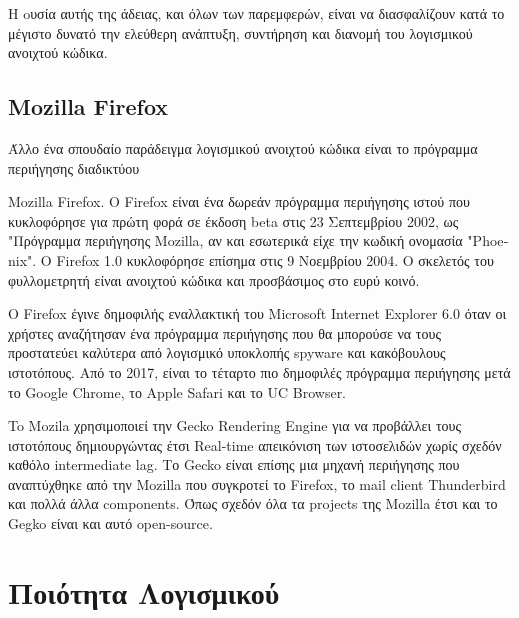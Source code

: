\documentclass[a4paper, 11pt]{article}
\begin{document}
{H oυσία αυτής της άδειας, και όλων των παρεμφερών, είναι να διασφαλίζουν κατά το μέγιστο δυνατό την ελεύθερη ανάπτυξη, συντήρηση και διανομή του λογισμικού ανοιχτού κώδικα.





\subsection{\textlatin{Mozilla Firefox}}
\indent Άλλο ένα σπουδαίο παράδειγμα λογισμικού ανοιχτού κώδικα είναι το πρόγραμμα περιήγησης διαδικτύου {\textlatin{Mozilla Firefox}. Ο \textlatin{Firefox} είναι ένα δωρεάν πρόγραμμα περιήγησης ιστού που κυκλοφόρησε για πρώτη φορά σε έκδοση beta στις 23 Σεπτεμβρίου 2002, ως "Πρόγραμμα περιήγησης \textlatin{Mozilla}, αν και εσωτερικά είχε την κωδική ονομασία \textlatin{"Phoenix"}. Ο \textlatin{Firefox} 1.0 κυκλοφόρησε επίσημα στις 9 Νοεμβρίου 2004. O σκελετός του φυλλομετρητή είναι ανοιχτού κώδικα και προσβάσιμος στο ευρύ κοινό.

Ο \textlatin{Firefox} έγινε δημοφιλής εναλλακτική του \textlatin{Microsoft Internet Explorer} 6.0 όταν οι χρήστες αναζήτησαν ένα πρόγραμμα περιήγησης που θα μπορούσε να τους προστατεύει καλύτερα από λογισμικό υποκλοπής \textlatin{spyware} και κακόβουλους ιστοτόπους. Από το 2017, είναι το τέταρτο πιο δημοφιλές πρόγραμμα περιήγησης μετά το \textlatin{Google Chrome}, το \textlatin{Apple Safari} και το \textlatin{UC Browser.}

To  \textlatin{Mozila} χρησιμοποιεί την  \textlatin{Gecko Rendering Engine} για να προβάλλει τους ιστοτόπους δημιουργώντας έτσι  \textlatin{Real-time} απεικόνιση των ιστοσελιδών χωρίς σχεδόν καθόλο  \textlatin{intermediate lag}. Το  \textlatin{Gecko} είναι επίσης μια μηχανή περιήγησης που αναπτύχθηκε από την  \textlatin{Mozilla} που συγκροτεί το  \textlatin{Firefox}, το  \textlatin{mail client Thunderbird} και πολλά άλλα  \textlatin{components}. Όπως σχεδόν όλα τα  \textlatin{projects} της  \textlatin{Mozilla} έτσι και το  \textlatin{Gegko} είναι και αυτό  \textlatin{open-source}.




\section{Ποιότητα Λογισμικού}
}}
\end{document}
